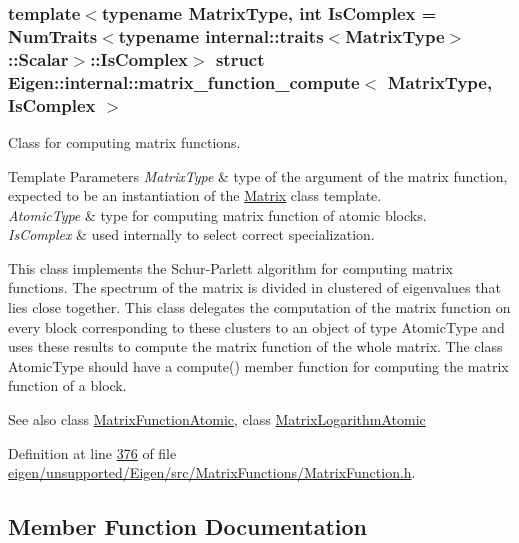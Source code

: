 \subsubsection*{template$<$typename Matrix\+Type, int Is\+Complex = Num\+Traits$<$typename internal\+::traits$<$\+Matrix\+Type$>$\+::\+Scalar$>$\+::\+Is\+Complex$>$\newline
struct Eigen\+::internal\+::matrix\+\_\+function\+\_\+compute$<$ Matrix\+Type, Is\+Complex $>$}

Class for computing matrix functions. 


\begin{DoxyTemplParams}{Template Parameters}
{\em Matrix\+Type} & type of the argument of the matrix function, expected to be an instantiation of the \hyperlink{group___core___module_class_eigen_1_1_matrix}{Matrix} class template. \\
\hline
{\em Atomic\+Type} & type for computing matrix function of atomic blocks. \\
\hline
{\em Is\+Complex} & used internally to select correct specialization.\\
\hline
\end{DoxyTemplParams}
This class implements the Schur-\/\+Parlett algorithm for computing matrix functions. The spectrum of the matrix is divided in clustered of eigenvalues that lies close together. This class delegates the computation of the matrix function on every block corresponding to these clusters to an object of type {\ttfamily Atomic\+Type} and uses these results to compute the matrix function of the whole matrix. The class {\ttfamily Atomic\+Type} should have a {\ttfamily compute()} member function for computing the matrix function of a block.

\begin{DoxySeeAlso}{See also}
class \hyperlink{class_eigen_1_1internal_1_1_matrix_function_atomic}{Matrix\+Function\+Atomic}, class \hyperlink{class_eigen_1_1internal_1_1_matrix_logarithm_atomic}{Matrix\+Logarithm\+Atomic} 
\end{DoxySeeAlso}


Definition at line \hyperlink{eigen_2unsupported_2_eigen_2src_2_matrix_functions_2_matrix_function_8h_source_l00376}{376} of file \hyperlink{eigen_2unsupported_2_eigen_2src_2_matrix_functions_2_matrix_function_8h_source}{eigen/unsupported/\+Eigen/src/\+Matrix\+Functions/\+Matrix\+Function.\+h}.



\subsection{Member Function Documentation}
\mbox{\label{struct_eigen_1_1internal_1_1matrix__function__compute_a55a328773f5254d0cd29ac699bc2634f}} 
